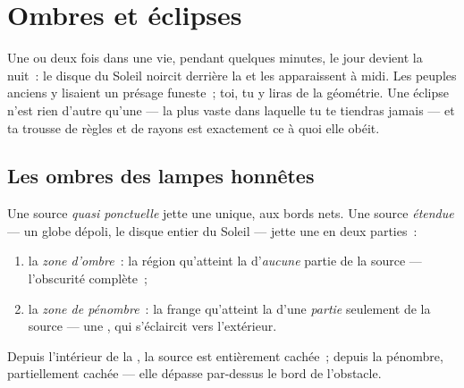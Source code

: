 \chapter{Ombres et éclipses}\label{ch:g7:shadows-eclipses}

Une ou deux fois dans une vie, pendant quelques minutes, le jour
devient la nuit~: le disque du Soleil noircit derrière la  et les
 apparaissent à midi. Les peuples anciens y lisaient un
présage funeste~; toi, tu y liras de la géométrie. Une éclipse n'est
rien d'autre qu'une  --- la plus vaste  dans laquelle tu te
tiendras jamais --- et ta trousse de règles et de rayons est
exactement ce à quoi elle obéit.

\section{Les ombres des lampes honnêtes}

\begin{proposition}\label{prop:g7:shadows-eclipses:umbra}
Une source \emph{quasi ponctuelle} jette une  unique, aux bords
nets. Une source \emph{étendue} --- un globe dépoli, le disque entier
du Soleil --- jette une  en deux parties~:
\begin{enumerate}
  \item la \emph{zone d'ombre}~: la région
        qu'atteint la  d'\emph{aucune} partie de la source
        --- l'obscurité complète~;
  \item la \emph{zone de pénombre}~: la
        frange qu'atteint la  d'une \emph{partie} seulement
        de la source --- une , qui s'éclaircit vers
        l'extérieur.
\end{enumerate}
Depuis l'intérieur de la , la source est entièrement
cachée~; depuis la pénombre, partiellement cachée --- elle dépasse
par-dessus le bord de l'obstacle.
\end{proposition}

